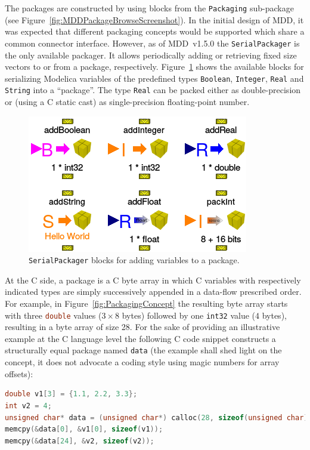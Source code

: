 \documentclass{resources/modelica}
\newcommand{\clang}[1]{\lstinline[language=c]|#1|}
\newcommand{\modelica}[1]{\lstinline[language=modelica]|#1|}
\begin{document}
\noindent
The packages are constructed by using blocks from the \modelica{Packaging}
sub-package (see Figure~\ref{fig:MDDPackageBrowseScreenshot}). In the initial
design of MDD, it was expected that different packaging concepts would be
supported which share a common connector interface. However, as of MDD~v1.5.0
the \modelica{SerialPackager} is the only available packager. It allows
periodically adding or retrieving fixed size vectors to or from a package, respectively.
Figure~\ref{fig:SerialPackagerBlocks} shows the available blocks for serializing
Modelica variables of the predefined types \modelica{Boolean}, \modelica{Integer}, \modelica{Real} and \mbox{\modelica{String}} into a ``package''.
The type \modelica{Real} can be packed either as double-precision or (using a C
static cast) as single-precision floating-point number.
\begin{figure}[h]
  \centering
  \includegraphics[width=0.6\columnwidth]{figures/SerialPackagerBlocks}
  \caption{\modelica{SerialPackager} blocks for adding variables to a package.}
  \label{fig:SerialPackagerBlocks}
\end{figure}

\noindent
At the C side, a package is a C byte array in which C variables with
respectively indicated types are simply successively appended in a data-flow
prescribed order. For example, in Figure~\ref{fig:PackagingConcept} the
resulting byte array starts with three \clang{double} values ($3 \times 8$ bytes)
followed by one \clang{int32} value ($4$ bytes), resulting in a byte array of size 28.
For the sake of providing an illustrative example at the C language level
the following C code snippet constructs a structurally equal package named
\clang{data} (the example shall shed light on the concept, it does not
advocate a coding style using magic numbers for array offsets):
\begin{lstlisting}[language=C]
double v1[3] = {1.1, 2.2, 3.3};
int v2 = 4;
unsigned char* data = (unsigned char*) calloc(28, sizeof(unsigned char));
memcpy(&data[0], &v1[0], sizeof(v1));
memcpy(&data[24], &v2, sizeof(v2));
\end{lstlisting}
\end{document}
